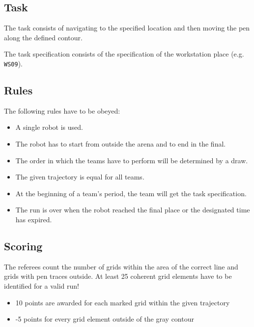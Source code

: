 \subsection{Task}
The task consists of navigating to the specified location and then
moving the pen along the defined contour. 
\par
The task specification consists of the specification of the workstation place (e.g. \texttt{WS09}).

\subsection{Rules}
The following rules have to be obeyed:

\begin{itemize}
\item A single robot is used. 
\item The robot has to start from outside the arena and to end in the final.
\item The order in which the teams have to perform will be determined by a draw.
\item The given trajectory is equal for all teams.
\item At the beginning of a team's period, the team will get the task specification.
\item The run is over when the robot reached the final place or the designated time has expired.
\end{itemize}

\subsection{Scoring}
The referees count the number of grids within the area of the correct line and
grids with pen traces outside. At least 25 coherent grid elements have to be
identified for a valid run!

\begin{itemize}
\item 10 points are awarded for each marked grid within the given trajectory
\item -5 points for every grid element outside of the gray contour
\end{itemize}

